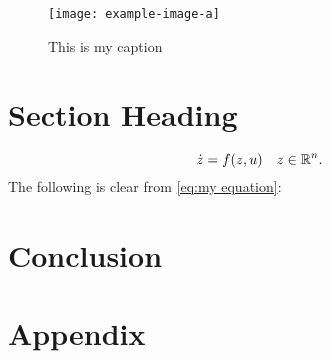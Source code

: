 \begin{figure}[htbp]
    \centering
    \texttt{[image: example-image-a]}
    \caption{This is my caption}
    \label{fig:this is a figure}
\end{figure}

\lipsum[7]

\section{Section Heading}

\lipsum[9]
\begin{equation}
    \label{eq:my equation}
    \dot z = f(z,u) \quad z \in \mathbb{R}^n.
\end{equation}
The following is clear from \cref{eq:my equation}:
\lipsum[10-11]

\section{Conclusion}
\label{sec:conclusion}
\lipsum[12]


\nocite{knuth:ct:a}
\nocite{glashow}
\nocite{aristotle:physics}
\nocite{moore}
\nocite{salam}
\nocite{ctan}
\nocite{loh}

\makeatletter%
\makeatother%

\appendix
\section{Appendix}
\label{sec:appendix}

\lipsum[1]
